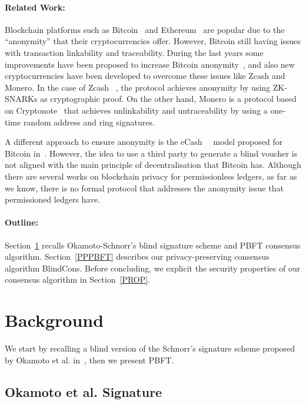 \documentclass[conference]{llncs}
\newcommand{\name}{BlindCons}
\begin{document}
\paragraph*{Related Work:}
Blockchain platforms such as Bitcoin~\cite{nakamoto2008bitcoin} and Ethereum~\cite{wood2014ethereum} are popular due to the ``anonymity'' that their cryptocurrencies offer. However, Bitcoin still having issues with transaction linkability and traceability.  During the last years some improvements have been proposed to increase Bitcoin anonymity~\cite{saxena2014increasing}, and also new cryptocurrencies have been developed to overcome these issues like Zcash and Monero. In the case of Zcash ~\cite{hopwood2016zcash}, the protocol achieves anonymity by using ZK-SNARKs as cryptographic proof. On the other hand, Monero is a protocol based on Cryptonote~\cite{van2013cryptonote} that achieves unlinkability and untraceability by using a one-time random address and ring signatures.

A different approach to ensure anonymity is the eCash~\cite{chaum1983blind}~\cite{chaum1988untraceable} model proposed for Bitcoin in~\cite{heilman2016blindly}. However, the idea to use a third party to generate a blind voucher is not aligned with the main principle of decentralisation that Bitcoin has. Although there are several works on blockchain privacy for permissionless ledgers, as far as we know, there is no formal protocol that addresses the anonymity issue that permissioned ledgers have.

\paragraph*{Outline:}  Section~\ref{back} recalls  Okamoto-Schnorr's blind signature scheme and PBFT consensus algorithm. Section~\ref{PPPBFT} describes our privacy-preserving consensus algorithm \name{}. Before concluding, we explicit the security properties of our consensus algorithm in Section~\ref{PROP}.


\section{Background} \label{back}

We start by recalling a blind version of the Schnorr's signature scheme proposed by Okamoto et al. in~\cite{okamoto1992provably}, then we present PBFT.

\subsection{Okamoto et al. Signature}
\label{Okamoto}
\end{document}
